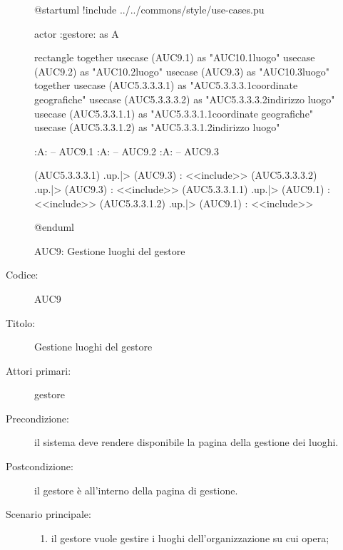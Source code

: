 \documentclass[../../../analisi-dei-requisiti.tex]{subfiles}
\begin{document}
\begin{figure}[H]
  \centering
  \begin{plantuml}
  @startuml
  !include ../../commons/style/use-cases.pu

  actor :gestore: as A

  rectangle {
    together {
      usecase (AUC9.1) as "AUC10.1\nAggiunta luogo"
      usecase (AUC9.2) as "AUC10.2\nRimozione luogo"
      usecase (AUC9.3) as "AUC10.3\nModifica luogo"
    }
    together {
      usecase (AUC5.3.3.3.1) as "AUC5.3.3.3.1\nModifica coordinate geografiche"
      usecase (AUC5.3.3.3.2) as "AUC5.3.3.3.2\nModifica indirizzo luogo"
      usecase (AUC5.3.3.1.1) as "AUC5.3.3.1.1\nInserisci coordinate geografiche"
      usecase (AUC5.3.3.1.2) as "AUC5.3.3.1.2\nInserisci indirizzo luogo"
    }
  }

  :A: -- AUC9.1
  :A: -- AUC9.2
  :A: -- AUC9.3

  (AUC5.3.3.3.1) .up.|> (AUC9.3) : <<include>>
  (AUC5.3.3.3.2) .up.|> (AUC9.3) : <<include>>
  (AUC5.3.3.1.1) .up.|> (AUC9.1) : <<include>>
  (AUC5.3.3.1.2) .up.|> (AUC9.1) : <<include>>

  @enduml
  \end{plantuml}
  \caption{AUC9: Gestione luoghi del gestore}%
  \label{fig:AUC9}
\end{figure}

\begin{description}
  \item[Codice:] AUC9
  \item[Titolo:] Gestione luoghi del gestore
  \item[Attori primari:] gestore
  \item[Precondizione:] il sistema deve rendere disponibile la pagina della gestione dei luoghi.
  \item[Postcondizione:] il gestore è all'interno della pagina di gestione.
  \item[Scenario principale:]
  \begin{enumerate}
    \item il gestore vuole gestire i luoghi dell'organizzazione su cui opera;
  \end{enumerate}
\end{description}
\end{document}
